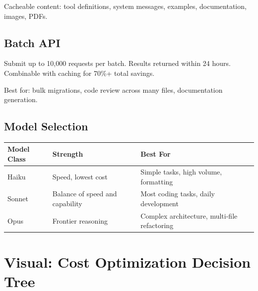 Cacheable content: tool definitions, system messages, examples, documentation,
images, PDFs.

\subsection{Batch API}

 Submit up to 10,000
requests per batch. Results returned within 24 hours.
Combinable with caching for 70\%+ total savings.

Best for: bulk migrations, code review across many files, documentation generation.

\subsection{Model Selection}

\begin{fullwidth}
\begin{tabular}{@{}llp{6cm}@{}}
\toprule
\textbf{Model Class} & \textbf{Strength} & \textbf{Best For} \\
\midrule
Haiku & Speed, lowest cost & Simple tasks, high volume, formatting \\
Sonnet & Balance of speed and capability & Most coding tasks, daily development \\
Opus & Frontier reasoning & Complex architecture, multi-file refactoring \\
\bottomrule
\end{tabular}
\end{fullwidth}



\section{Visual: Cost Optimization Decision Tree}

